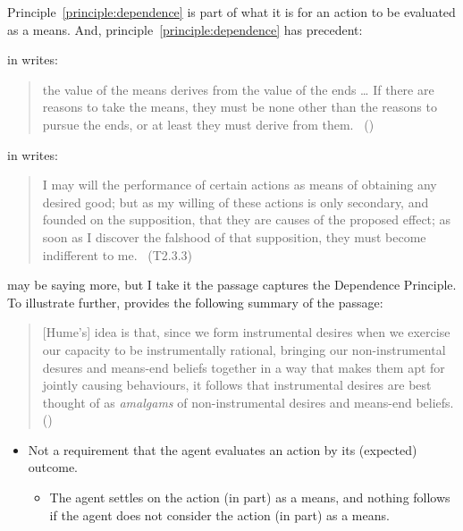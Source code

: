 \documentclass[10pt]{article}
\newcommand{\hand}{\ding{43}}
\newcommand{\dependencePrinciple}[0]{\textsf{Dependence Principle}}
\begin{document}
Principle~\ref{principle:dependence} is part of what it is for an action to be evaluated as a means.
And, principle~\ref{principle:dependence} has precedent:

\citeauthor{Raz:2005aa} in  writes:
\begin{quote}
    the value of the means derives from the value of the ends \dots
    If there are reasons to take the means, they must be none other than the reasons to pursue the ends, or at least they must derive from them.\nolinebreak
  \mbox{ }\hfill(\cite[2]{Raz:2005aa})
\end{quote}

\citeauthor{Hume:2011aa} in  writes:

\begin{quote}
  I may will the performance of certain actions as means of obtaining any desired good; but as my willing of these actions is only secondary, and founded on the supposition, that they are causes of the proposed effect; as soon as I discover the falshood of that supposition, they must become indifferent to me.\nolinebreak
  \mbox{ }\hfill\mbox{\hfill(T2.3.3)}
\end{quote}

\citeauthor{Hume:2011aa} may be saying more, but I take it the passage captures the \dependencePrinciple.
To illustrate further, \citeauthor{Smith:2015ab} provides the following summary of the passage:

\begin{quote}
  [Hume's] idea is that, since we form instrumental desires when we exercise our capacity to be instrumentally rational, bringing our non-instrumental desures and means-end beliefs together in a way that makes them apt for jointly causing behaviours, it follows that instrumental desires are best thought of as \emph{amalgams} of non-instrumental desires and means-end beliefs.\nolinebreak
  \mbox{}\hfill\mbox{(\citeyear[35]{Smith:2015ab})}
\end{quote}


\begin{itemize}
\item[\hand] Not a requirement that the agent evaluates an action by its (expected) outcome.
  \begin{itemize}
  \item The agent settles on the action (in part) as a means, and nothing follows if the agent does not consider the action (in part) as a means.
  \end{itemize}
\end{itemize}
\end{document}
